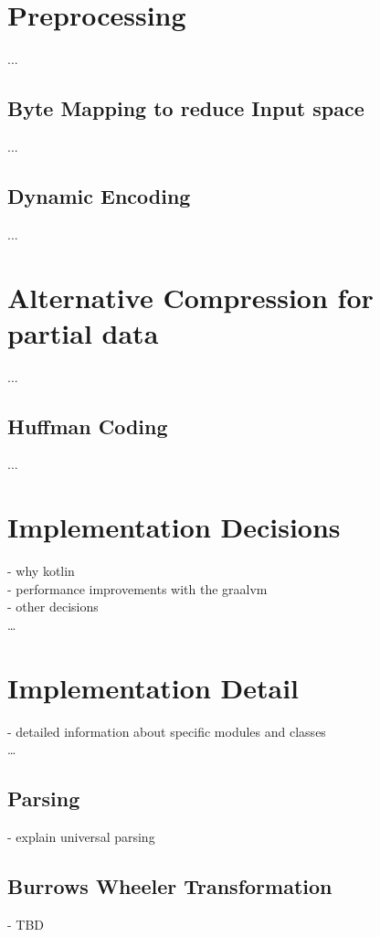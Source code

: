 \section{Preprocessing}
\label{ch:Conceptual Design:sec:Preprocessing}
...
\subsection{Byte Mapping to reduce Input space}
...
\subsection{Dynamic Encoding}
...

\section{Alternative Compression for partial data}
\label{ch:Conceptual Design:sec:Alternative Encoding}
...
\subsection{Huffman Coding}
...

\section{Implementation Decisions}
\label{ch:Conceptual Design:sec:Implementation Decisions}
- why kotlin\\
- performance improvements with the graalvm\\
- other decisions\\
\ldots

\section{Implementation Detail}
\label{ch:Conceptual Design:sec:Implementation Detail}
- detailed information about specific modules and classes\\
\ldots


\subsection{Parsing}
- explain universal parsing\\
\subsection{Burrows Wheeler Transformation}
- TBD\\
